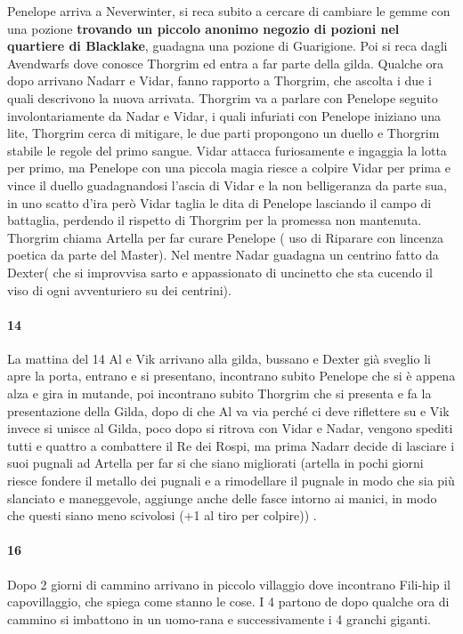 \documentclass{article}
\begin{document}
Penelope arriva a Neverwinter, si reca subito a cercare di cambiare le gemme con una pozione \textbf{trovando un piccolo anonimo negozio di pozioni nel quartiere di Blacklake}, guadagna una pozione di Guarigione. Poi si reca dagli Avendwarfs dove conosce Thorgrim ed entra a far parte della gilda. Qualche ora dopo arrivano Nadarr e Vidar, fanno rapporto a Thorgrim, che ascolta i due i quali descrivono la nuova arrivata. Thorgrim va a parlare con Penelope seguito involontariamente da Nadar e Vidar, i quali infuriati con Penelope iniziano una lite, Thorgrim cerca di mitigare, le due parti propongono un duello e Thorgrim stabile le regole del primo sangue. Vidar attacca furiosamente e ingaggia la lotta per primo, ma Penelope con una piccola magia riesce a colpire Vidar per prima e vince il duello guadagnandosi l'ascia di Vidar e la non belligeranza da parte sua, in uno scatto d'ira però Vidar taglia le dita di Penelope lasciando il campo di battaglia, perdendo il rispetto di Thorgrim per la promessa non mantenuta. Thorgrim chiama Artella per far curare Penelope ( uso di Riparare con lincenza poetica da parte del Master). Nel mentre Nadar guadagna un centrino fatto da Dexter( che si improvvisa sarto e appassionato di uncinetto che sta cucendo il viso di ogni avventuriero su dei centrini).

                  \paragraph{14}
La mattina del 14 Al e Vik arrivano alla gilda,  bussano e Dexter già sveglio li apre la porta, entrano e si presentano, incontrano subito Penelope che si è appena alza e gira in mutande, poi incontrano subito Thorgrim che si presenta e fa la presentazione della Gilda, dopo di che Al va via perché ci deve riflettere su e Vik invece si unisce al Gilda, poco dopo si ritrova con Vidar e Nadar, vengono spediti tutti e quattro a combattere il Re dei Rospi, ma prima Nadarr decide di lasciare i suoi pugnali ad Artella per far si che siano migliorati (artella in pochi giorni riesce fondere il metallo dei pugnali e a rimodellare il pugnale in modo che sia più slanciato e maneggevole, aggiunge anche delle fasce intorno ai manici, in modo che questi siano meno scivolosi (+1 al tiro per colpire)) . 


                  \paragraph{16}
Dopo 2 giorni di cammino arrivano in piccolo villaggio dove incontrano Fili-hip il capovillaggio, che spiega come stanno le cose. I 4 partono de dopo qualche ora di cammino si imbattono in un uomo-rana e successivamente i 4 granchi giganti.
\end{document}
